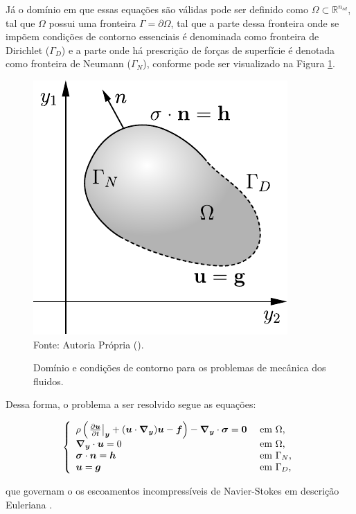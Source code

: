 Já o domínio em que essas equações são válidas pode ser definido como $\Omega\subset\mathbb{R}^{n_{sd}}$, tal que $\Omega$ possui uma fronteira $\Gamma=\partial\Omega$, tal que a parte dessa fronteira onde se impõem condições de contorno essenciais é denominada como fronteira de Dirichlet ($\Gamma_D$) e a parte onde há prescrição de forças de superfície é denotada como fronteira de Neumann ($\Gamma_N$), conforme pode ser visualizado na Figura \ref{fig:Dom}.

\begin{figure}[h!]
    \centering
    \caption{Domínio e condições de contorno para os problemas de mecânica dos fluidos.}
    \includegraphics[width=.35\linewidth]{Figuras/Dom}
    \\Fonte: Autoria Própria (\the\year).
    \label{fig:Dom}
\end{figure}

Dessa forma, o problema a ser resolvido segue as equações:

\begin{equation}
    \left\{
    \begin{array}{ll}
        \rho\left({\left.\frac{\partial \boldsymbol{u}}{\partial t}\right|_{\boldsymbol{y}}+(\boldsymbol{u}\cdot\boldsymbol{\nabla_y})\boldsymbol{u}-\boldsymbol{f}}\right)-\boldsymbol{\nabla_y}\cdot\boldsymbol{\sigma}=\boldsymbol{0} & \text{ em }\Omega\text{,}   \\
        \boldsymbol{\nabla_y}\cdot\boldsymbol{u}=0                                                               & \text{ em }\Omega\text{,}   \\
        \boldsymbol{\sigma}\cdot\boldsymbol{n}=\boldsymbol{h}                                                        & \text{ em }\Gamma_N\text{,} \\
        \boldsymbol{u}=\boldsymbol{g}                                                                  & \text{ em }\Gamma_D\text{,}
    \end{array}
    \right.
    \label{eq:NS-Euler}
\end{equation}

\noindent que governam o os escoamentos incompressíveis de Navier-Stokes em descrição Euleriana \cite{bazilevs2013computational,bazilevs2010large,bazilevs2007variational,hughes2002variational,hughes2000large}.

